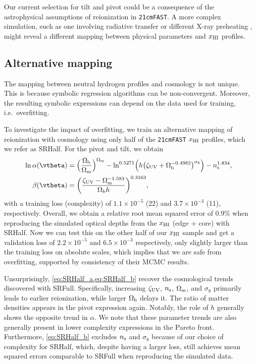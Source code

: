 Our current selection for tilt and pivot could be a consequence of the
astrophysical assumptions of reionization in \texttt{21cmFAST}.
A more complex simulation, such as one involving radiative transfer or
different X-ray preheating \cite{Montero2024}, might reveal a different
mapping between physical parameters and $x_{\mathrm{HI}}$ profiles.


\subsection*{Alternative mapping}
\label{ssec:SRHalf}

The mapping between neutral hydrogen profiles and cosmology is not
unique.
This is because symbolic regression algorithms can be non-convergent.
Moreover, the resulting symbolic expressions can depend on the data used
for training, i.e.\ overfitting.

To investigate the impact of overfitting, we train an alternative
mapping of reionization with cosmology using only half of the
\texttt{21cmFAST} $x_{\mathrm{HI}}$ profiles, which we refer as SRHalf.
For the pivot and tilt, we obtain
%
\begin{align}
\label{eq:SRHalf_a}
\ln\ap(\vtheta) &= \Bigl(\frac{\Omegab}{\Omegam}\Bigr)^{\Omegam}
  - \ln^{0.5271} \Bigl(h \bigl(\zetaUV
    + \Omegab^{-0.4982}\bigr)^{\sigma_8}\Bigr)
  - \ns^{1.834}, \\
%
\label{eq:SRHalf_b}
\beta(\vtheta) &= \biggl(\frac{\zetaUV - \Omegam^{-1.583}}{\Omegab h}
  \biggr)^{0.3163},
\end{align}
%
with a training loss (complexity) of $1.1 \times 10^{-5}$ (22) and $3.7
\times 10^{-3}$ (11), respectively.
Overall, we obtain a relative root mean squared error of 0.9\% when
reproducing the simulated optical depths from the $x_{\mathrm{HI}}$ (edge + core)
with SRHalf.
Now we can test this on the other half of our $x_{\mathrm{HI}}$ sample and get a
validation loss of $2.2 \times 10^{-5}$ and $6.5 \times 10^{-3}$
respectively, only slightly larger than the training loss on absolute
scales, which implies that we are safe from overfitting, supported by
consistency of their MCMC results.

Unsurprisingly, \cref{eq:SRHalf_a,eq:SRHalf_b} recover the cosmological
trends discovered with SRFull.
Specifically, increasing $\zeta_\mathrm{UV}$, $n_\mathrm{s}$, $\Omega_\mathrm{m}$, and $\sigma_8$
primarily leads to earlier reionization, while larger $\Omega_\mathrm{b}$ delays
it.
The ratio of matter densities appears in the pivot expression again.
Notably, the role of $h$ generally shows the opposite trend in $\alpha$.
We note that these parameter trends are also generally present in lower
complexity expressions in the Pareto front.
Furthermore, \cref{eq:SRHalf_b} excludes $n_\mathrm{s}$ and $\sigma_8$ because of
our choice of complexity for SRHalf, which, despite having a larger
loss, still achieves mean squared errors comparable to SRFull when
reproducing the simulated data.


